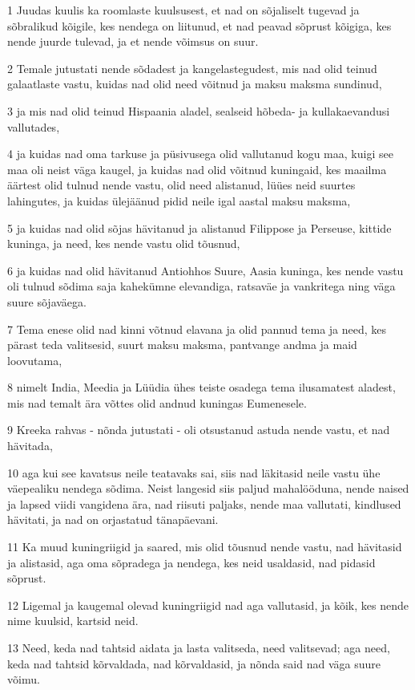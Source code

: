 \par 1 Juudas kuulis ka roomlaste kuulsusest, et nad on sõjaliselt tugevad ja sõbralikud kõigile, kes nendega on liitunud, et nad peavad sõprust kõigiga, kes nende juurde tulevad, ja et nende võimsus on suur.
\par 2 Temale jutustati nende sõdadest ja kangelastegudest, mis nad olid teinud galaatlaste vastu, kuidas nad olid need võitnud ja maksu maksma sundinud,
\par 3 ja mis nad olid teinud Hispaania aladel, sealseid hõbeda- ja kullakaevandusi vallutades,
\par 4 ja kuidas nad oma tarkuse ja püsivusega olid vallutanud kogu maa, kuigi see maa oli neist väga kaugel, ja kuidas nad olid võitnud kuningaid, kes maailma äärtest olid tulnud nende vastu, olid need alistanud, lüües neid suurtes lahingutes, ja kuidas ülejäänud pidid neile igal aastal maksu maksma,
\par 5 ja kuidas nad olid sõjas hävitanud ja alistanud Filippose ja Perseuse, kittide kuninga, ja need, kes nende vastu olid tõusnud,
\par 6 ja kuidas nad olid hävitanud Antiohhos Suure, Aasia kuninga, kes nende vastu oli tulnud sõdima saja kahekümne elevandiga, ratsaväe ja vankritega ning väga suure sõjaväega.
\par 7 Tema enese olid nad kinni võtnud elavana ja olid pannud tema ja need, kes pärast teda valitsesid, suurt maksu maksma, pantvange andma ja maid loovutama,
\par 8 nimelt India, Meedia ja Lüüdia ühes teiste osadega tema ilusamatest aladest, mis nad temalt ära võttes olid andnud kuningas Eumenesele.
\par 9 Kreeka rahvas - nõnda jutustati - oli otsustanud astuda nende vastu, et nad hävitada,
\par 10 aga kui see kavatsus neile teatavaks sai, siis nad läkitasid neile vastu ühe väepealiku nendega sõdima. Neist langesid siis paljud mahalööduna, nende naised ja lapsed viidi vangidena ära, nad riisuti paljaks, nende maa vallutati, kindlused hävitati, ja nad on orjastatud tänapäevani.
\par 11 Ka muud kuningriigid ja saared, mis olid tõusnud nende vastu, nad hävitasid ja alistasid, aga oma sõpradega ja nendega, kes neid usaldasid, nad pidasid sõprust.
\par 12 Ligemal ja kaugemal olevad kuningriigid nad aga vallutasid, ja kõik, kes nende nime kuulsid, kartsid neid.
\par 13 Need, keda nad tahtsid aidata ja lasta valitseda, need valitsevad; aga need, keda nad tahtsid kõrvaldada, nad kõrvaldasid, ja nõnda said nad väga suure võimu.
